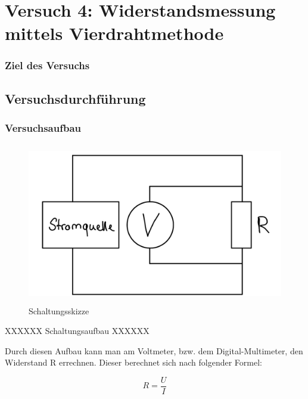 \chapter*{Versuch 4: Widerstandsmessung mittels Vierdrahtmethode}

\subsection*{Ziel des Versuchs}

\section*{Versuchsdurchführung}

\subsection{Versuchsaufbau}

\begin{figure}[H]
	\centering
	\includegraphics[height=7cm]{images/Versuch4/Schaltskizze.jpeg}
	\caption{Schaltungsskizze}
	\label{fig: Schaltungsskizze}
\end{figure}

XXXXXX Schaltungsaufbau XXXXXX

Durch diesen Aufbau kann man am Voltmeter, bzw. dem Digital-Multimeter,
den Widerstand R errechnen. Dieser berechnet sich nach folgender Formel:

\begin{equation}
    R = \frac{U}{I}
    \label{eq:R}
\end{equation}